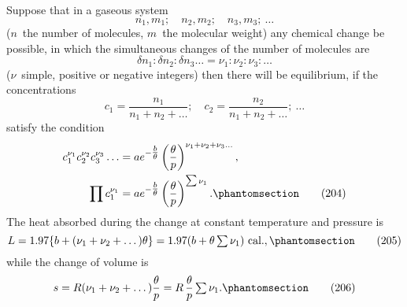\documentclass[12pt]{book}[2005/09/16]
\newcommand{\Chg}[2]{#2}
\newcommand{\Add}[1]{\Chg{}{#1}}
\newcommand{\Tag}[1]{%
  \phantomsection\label{eqn:#1}\tag*{\ensuremath{#1}}%
}
\newcommand{\PageSep}[1]{\ignorespaces}
\newcommand{\efrac}[2]{\tfrac{#1}{#2}}
\newcommand{\tsum}{\mathop{\textstyle\sum}\limits}
\newcommand{\Unit}[1]{\text{\upshape #1}}
\begin{document}
Suppose that in a gaseous system
\[
n_{1}, m_{1};\quad
n_{2}, m_{2};\quad
n_{3}, m_{3};\ \dots
\]
($n$~the number of molecules, $m$~the molecular weight) any
chemical change be possible, in which the simultaneous
changes of the number of molecules are
\[
\delta n_{1} : \delta n_{2} : \delta n_{3} \dots = \nu_{1} : \nu_{2} : \nu_{3} : \dots
\]
($\nu$~simple, positive or negative integers) then there will be
equilibrium, if the concentrations
\[
c_{1} = \frac{n_{1}}{n_{1} + n_{2} + \Add{\dots}};\quad
c_{2} = \frac{n_{2}}{n_{1} + n_{2} + \Add{\dots}};\ \dots
\]
satisfy the condition
\begin{align*}
c_{1}^{\nu_{1}} c_{2}^{\nu_{2}} c_{3}^{\nu_{3}} \dots
  &= ae^{-\efrac{b}{\theta}} \left(\frac{\theta}{p}\right)^{\nu_{1} + \nu_{2} + \nu_{3} \dots}\Add{,} \\
\prod c_{1}^{\nu_{1}}
  &= ae^{-\efrac{b}{\theta}} \left(\frac{\theta}{p}\right)^{\tsum \nu_{1}}\Add{.}
\Tag{(204)}
\end{align*}
\PageSep{219}
The heat absorbed during the change at constant temperature
and pressure is
\[
L = 1.97 \{b + (\nu_{1} + \nu_{2} + \dots) \theta\} = 1.97 (b + \theta \tsum \nu_{1})~\Unit{cal.}\Add{,}
\Tag{(205)}
\]
while the change of volume is
\[
s = R(\nu_{1} + \nu_{2} + \dots) \frac{\theta}{p} = R\, \frac{\theta}{p} \tsum \nu_{1}.
\Tag{(206)}
\]
\end{document}
